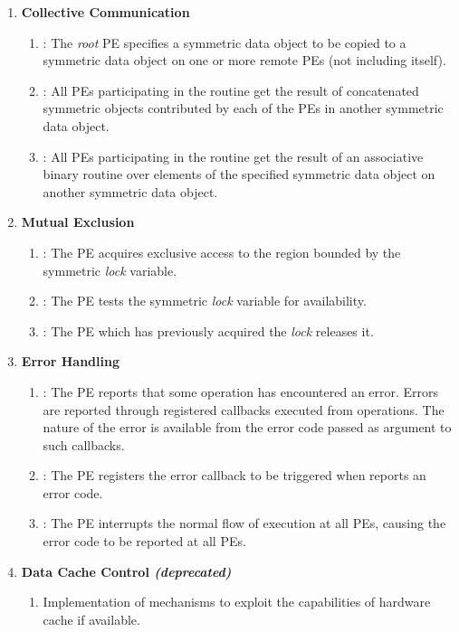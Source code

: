 \begin{enumerate}
\item \textbf{Collective Communication}
\begin{enumerate}
  \item {}: The \textit{root} \ac{PE} specifies a symmetric data
      object to be copied to a symmetric data object on one or more remote
      \acp{PE} (not including itself). 
  \item {}: All \acp{PE} participating in the routine get the result
      of concatenated symmetric objects contributed by each of the \acp{PE} in
      another symmetric data object.
  \item {}: All \acp{PE} participating in the routine get the result
      of an associative binary routine over elements of the specified symmetric
      data object on another symmetric data object. 
\end{enumerate}

\item \textbf{Mutual Exclusion}
\begin{enumerate}
  \item {}: The \ac{PE} acquires exclusive access to the region
      bounded by the symmetric \textit{lock} variable.
  \item {}: The \ac{PE} tests the symmetric \textit{lock} variable
      for availability.
  \item {}: The \ac{PE} which has previously acquired the
      \textit{lock} releases it.
\end{enumerate}

\item \textbf{Error Handling}
\begin{enumerate}
  \item {}: The \ac{PE} reports that some operation has encountered 
      an error. Errors are reported through registered callbacks executed 
      from \openshmem operations. The nature of the error is available from 
      the error code passed as argument to such callbacks.
  \item {}: The \ac{PE} registers the error callback to be triggered
      when \openshmem reports an error code.
  \item {}: The \ac{PE} interrupts the normal flow of execution at all 
      \acp{PE}, causing the error code to be reported at all \acp{PE}.
\end{enumerate}

\item \textbf{Data Cache Control \textit{(deprecated)}}
\begin{enumerate}
  \item Implementation of mechanisms to exploit the capabilities of hardware cache
      if available.
\end{enumerate}
\end{enumerate}
